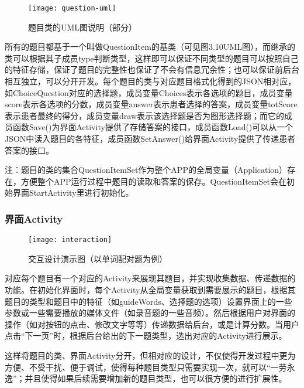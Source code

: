 \begin{figure}[h]
  \centering
  \texttt{[image: question-uml]}
  \caption{题目类的UML图说明（部分）}
\end{figure}

所有的题目都基于一个叫做QuestionItem的基类（可见图3.10UML图），而继承的类可以根据其子成员type判断类型，这样即可以保证不同类型的题目可以按照自己的特征存储，保证了题目的完整性也保证了不会有信息冗余性；也可以保证前后台相互独立，可以分开开发。每个题目的类与对应题目格式化得到的JSON相对应，如ChoiceQuestion对应的选择题，成员变量Choices表示各选项的题目，成员变量score表示各选项的分数，成员变量answer表示患者选择的答案，成员变量totScore表示患者最终的得分，成员变量draw表示该选择题是否为图形选择题；而它的成员函数Save()为界面Activity提供了存储答案的接口，成员函数Load()可以从一个JSON中读入题目的各特征，成员函数SetAnswer()给界面Activity提供了传递患者答案的接口。

注：题目的类的集合QuestionItemSet作为整个APP的全局变量（Application）存在，方便整个APP运行过程中题目的读取和答案的保存。QuestionItemSet会在初始界面StartActivity里进行初始化。

\subsubsection{界面Activity}

\begin{figure}[h]
  \centering
  \texttt{[image: interaction]}
  \caption{交互设计演示图（以单词配对题为例）}
\end{figure}

对应每个题目有一个对应的Activity来展现其题目，并实现收集数据、传递数据的功能。在初始化界面时，每个Activity从全局变量获取到需要展示的题目，根据其题目的类型和题目中的特征（如guideWords、选择题的选项）设置界面上的一些参数或一些需要播放的媒体文件（如录音题的一些音频）。然后根据用户对界面的操作（如对按钮的点击、修改文字等等）传递数据给后台，或是计算分数。当用户点击“下一页”时，根据后台给出的下一题类型，选出对应的Activity进行展示。

这样将题目的类、界面Activity分开，但相对应的设计，不仅使得开发过程中更为方便、不受干扰、便于调试，使得每种题目类型只需要实现一次，就可以“一劳永逸”；并且使得如果后续需要增加新的题目类型，也可以很方便的进行扩展性。
